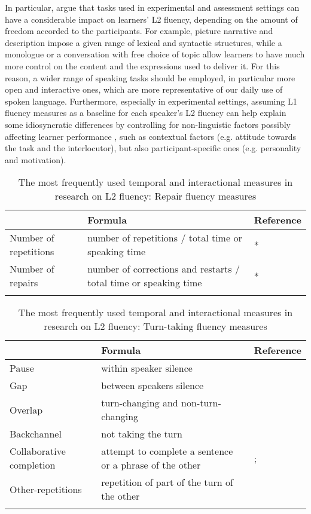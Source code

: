 In particular, \citet{DerwingEtAl2004} argue that tasks used in experimental and assessment settings can have a considerable impact on learners’ L2 fluency, depending on the amount of freedom accorded to the participants. For example, picture narrative and description impose a given range of lexical and syntactic structures, while a monologue or a conversation with free choice of topic allow learners to have much more control on the content and the expressions used to deliver it. For this reason, a wider range of speaking tasks should be employed, in particular more open and interactive ones, which are more representative of our daily use of spoken language. Furthermore, especially in experimental settings, assuming L1 fluency measures as a baseline for each speaker’s L2 fluency can help explain some idiosyncratic differences by controlling for non-linguistic factors possibly affecting learner performance \citep{Segalowitz2016}, such as contextual factors (e.g. attitude towards the task and the interlocutor), but also participant-specific ones (e.g. personality and motivation).


\begin{table}[t]
\footnotesize
\caption{\label{tab:3.1c}The most frequently used temporal and interactional measures in research on L2 fluency: Repair fluency  measures}
\begin{tabularx}{\textwidth}{lQl}
\lsptoprule
{} & Formula & {Reference}\\
\midrule
Number of repetitions & number of repetitions / total time or speaking time & \citet{DeJong2016}*\\
Number of repairs & number of corrections and restarts / total time or speaking time & \citet{DeJong2016}*\\
\lspbottomrule
\end{tabularx}
\end{table}

\begin{table}[t]
\footnotesize
\caption{\label{tab:3.1d}The most frequently used temporal and interactional measures in research on L2 fluency: Turn-taking fluency measures}
\begin{tabularx}{\textwidth}{lQQ}
\lsptoprule
{} & Formula & {Reference}\\
\midrule
Pause & within speaker silence & \citet{HeldnerEdlund2010}\\
Gap & between speakers silence & \citet{HeldnerEdlund2010}\\
Overlap & turn-changing and non-turn-changing & \citet{HeldnerEdlund2010}\\
Backchannel & not taking the turn & \citet{Riggenbach1991} \\
Collaborative completion & attempt to complete a sentence or a phrase of the other & \citet{Riggenbach1991}; \citet{Peltonen2017}\\
Other-repetitions & repetition of part of the turn of the other & \citet{Peltonen2017}\\
\lspbottomrule
\end{tabularx}
\end{table}

